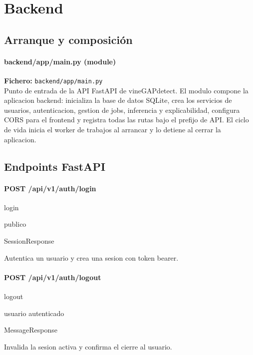 \chapter{Backend}


\section{Arranque y composición}
\subsubsection*{backend/app/main.py (module)}
\noindent\textbf{Fichero:} \texttt{backend/app/main.py}\\
Punto de entrada de la API FastAPI de vineGAPdetect. El modulo compone la aplicacion backend: inicializa la base de datos SQLite, crea los servicios de usuarios, autenticacion, gestion de jobs, inferencia y explicabilidad, configura CORS para el frontend y registra todas las rutas bajo el prefijo de API. El ciclo de vida inicia el worker de trabajos al arrancar y lo detiene al cerrar la aplicacion.



\section{Endpoints FastAPI}
\subsubsection*{POST /api/v1/auth/login}
\begin{description}[leftmargin=2.8cm,style=nextline]
\item[Handler] login
\item[Acceso] publico
\item[Respuesta] SessionResponse
\end{description}
Autentica un usuario y crea una sesion con token bearer.


\subsubsection*{POST /api/v1/auth/logout}
\begin{description}[leftmargin=2.8cm,style=nextline]
\item[Handler] logout
\item[Acceso] usuario autenticado
\item[Respuesta] MessageResponse
\end{description}
Invalida la sesion activa y confirma el cierre al usuario.


